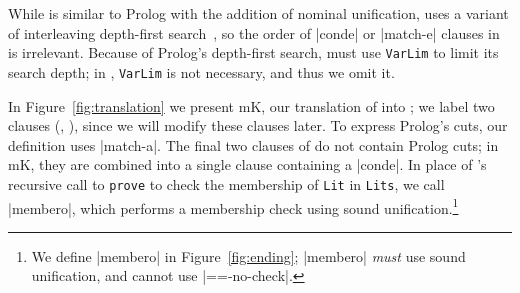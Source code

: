 While \alphakanrensp is similar to Prolog with the addition of nominal
unification, \alphakanrensp uses a variant of interleaving
depth-first search~\cite{backtracking}, so the order of
\scheme|conde| or \scheme|match-e| clauses in \alphakanrensp is irrelevant. Because of
Prolog's depth-first search, \leantapsp must use \texttt{VarLim} to
limit its search depth; in \alphakanren, \texttt{VarLim} is not
necessary, and thus we omit it.


In Figure~\ref{fig:translation} we present mK\leantap, our translation
of \leantapsp into \alphakanren; we label two clauses (\onet, \twot),
since we will modify these clauses later. To express Prolog's cuts,
our definition uses \scheme|match-a|.  The final two clauses of
\leantapsp do not contain Prolog cuts; in mK\leantap, they are
combined into a single clause containing a \scheme|conde|.  In place
of \leantap\thinspace's recursive call to \texttt{prove} to check the
membership of \texttt{Lit} in \texttt{Lits}, we call \scheme|membero|,
which performs a membership check using sound unification.\footnote{We define \scheme|membero| in Figure~\ref{fig:ending}; \scheme|membero| \emph{must} use sound unification, and cannot use \scheme|==-no-check|.}  %


